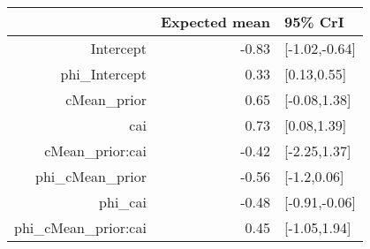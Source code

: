 \begin{tabular}{rrl}
  \hline
 & Expected mean & 95\% CrI \\ 
  \hline
Intercept & -0.83 & [-1.02,-0.64] \\ 
  phi\_Intercept & 0.33 & [0.13,0.55] \\ 
  cMean\_prior & 0.65 & [-0.08,1.38] \\ 
  cai & 0.73 & [0.08,1.39] \\ 
  cMean\_prior:cai & -0.42 & [-2.25,1.37] \\ 
  phi\_cMean\_prior & -0.56 & [-1.2,0.06] \\ 
  phi\_cai & -0.48 & [-0.91,-0.06] \\ 
  phi\_cMean\_prior:cai & 0.45 & [-1.05,1.94] \\ 
   \hline
\end{tabular}

